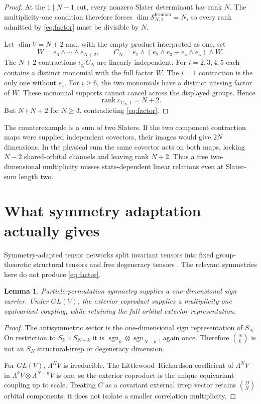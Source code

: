 \documentclass[11pt]{article}
\newtheorem{lemma}[theorem]{Lemma}
\newcommand{\rank}{\operatorname{rank}}
\begin{document}
\begin{proof}
At the $1\mid N-1$ cut, every nonzero Slater determinant has rank $N$.
The multiplicity-one condition therefore forces
$\dim\mathcal S^{\mathrm{fermion}}_{N,1}=N$, so every rank admitted by
\eqref{eq:factor} must be divisible by $N$.

Let $\dim V=N+2$ and, with the empty product interpreted as one, set
\[
 W=e_6\wedge\cdots\wedge e_{N+2},\qquad
 C_N=e_1\wedge(e_2\wedge e_3+e_4\wedge e_5)\wedge W.
\]
The $N+2$ contractions $\iota_{e_i^*}C_N$ are linearly independent.
For $i=2,3,4,5$ each contains a distinct monomial with the full factor $W$.
The $i=1$ contraction is the only one without $e_1$. For $i\ge6$, the two
monomials have a distinct missing factor of $W$. These monomial supports cannot
cancel across the displayed groups. Hence
\[
 \rank c_{C_N,1}=N+2.
\]
But $N\nmid N+2$ for $N\ge3$, contradicting \eqref{eq:factor}.
\end{proof}

The counterexample is a sum of two Slaters. If the two component contraction
maps were supplied independent covectors, their images would give $2N$
dimensions. In the physical sum the same covector acts on both maps, locking
$N-2$ shared-orbital channels and leaving rank $N+2$. Thus a free
two-dimensional multiplicity misses state-dependent linear relations even at
Slater-sum length two.

\section{What symmetry adaptation actually gives}

Symmetry-adapted tensor networks split invariant tensors into fixed
group-theoretic structural tensors and free degeneracy tensors
\cite{SinghPfeiferVidal2010,Weichselbaum2012}. The relevant symmetries here do
not produce \eqref{eq:factor}.

\begin{lemma}
Particle-permutation symmetry supplies a one-dimensional sign carrier. Under
$GL(V)$, the exterior coproduct supplies a multiplicity-one equivariant
coupling, while retaining the full orbital exterior representation.
\end{lemma}

\begin{proof}
The antisymmetric sector is the one-dimensional sign representation of $S_N$.
On restriction to $S_k\times S_{N-k}$ it is
$\operatorname{sgn}_k\otimes\operatorname{sgn}_{N-k}$, again once. Therefore
$\binom Nk$ is not an $S_N$ structural-irrep or degeneracy dimension.

For $GL(V)$, $\Lambda^N V$ is irreducible. The Littlewood--Richardson
coefficient of $\Lambda^N V$ in
$\Lambda^kV\otimes\Lambda^{N-k}V$ is one, so the exterior coproduct is the
unique equivariant coupling up to scale. Treating $C$ as a covariant external
irrep vector retains $\binom DN$ orbital components; it does not isolate a
smaller correlation multiplicity.
\end{proof}
\end{document}

